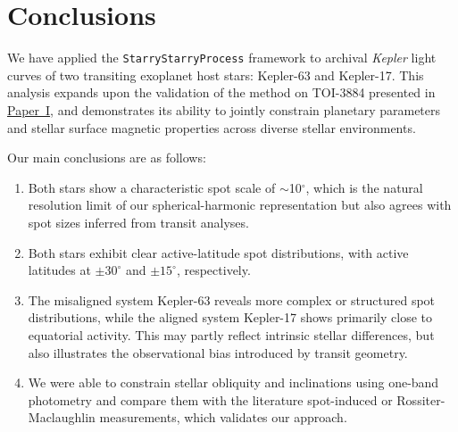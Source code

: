 \documentclass[twocolumn]{aastex631}
\newcommand{\paperone}{\hyperlink{cite.paper1}{Paper~I}}
\begin{document}


\section{Conclusions}

We have applied the \texttt{StarryStarryProcess} framework to archival \textit{Kepler} light curves
of two transiting exoplanet host stars: Kepler-63 and Kepler-17. This
analysis expands upon the validation of the method on TOI-3884 presented in \paperone, and
demonstrates its ability to jointly constrain planetary parameters and stellar surface magnetic
properties across diverse stellar environments.

Our main conclusions are as follows:

\begin{enumerate}
    \item Both stars show a characteristic spot scale of $\sim$10$^\circ$, which is the 
    natural resolution limit of our spherical-harmonic representation but also agrees with spot 
    sizes inferred from transit analyses.  

    \item Both stars
    exhibit clear active-latitude spot distributions, with active latitudes at $\pm 30^\circ$ and $\pm 15^\circ$,
    respectively. 

    \item The misaligned system Kepler-63 reveals more complex or structured spot distributions, while the aligned system
    Kepler-17 shows primarily close to equatorial activity. This may partly reflect
    intrinsic stellar differences, but also illustrates the observational bias introduced by
    transit geometry.

    \item We were able to constrain stellar obliquity and inclinations using one-band photometry and compare them
    with the literature spot-induced or Rossiter-Maclaughlin measurements, which validates our approach.
\end{enumerate}
\end{document}
